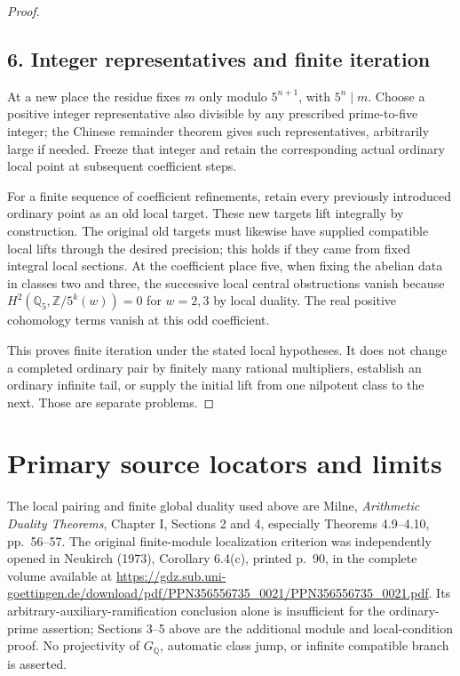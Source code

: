 \documentclass[11pt]{article}
\newcommand{\Z}{\mathbb Z}\newcommand{\F}{\mathbb F}\newcommand{\Q}{\mathbb Q}
\begin{document}
\begin{proof}
\subsection*{6. Integer representatives and finite iteration}
At a new place the residue fixes $m$ only modulo $5^{n+1}$, with $5^n\mid m$. Choose a positive integer representative also divisible by any prescribed prime-to-five integer; the Chinese remainder theorem gives such representatives, arbitrarily large if needed. Freeze that integer and retain the corresponding actual ordinary local point at subsequent coefficient steps.

For a finite sequence of coefficient refinements, retain every previously introduced ordinary point as an old local target. These new targets lift integrally by construction. The original old targets must likewise have supplied compatible local lifts through the desired precision; this holds if they came from fixed integral local sections. At the coefficient place five, when fixing the abelian data in classes two and three, the successive local central obstructions vanish because $H^2(\Q_5,\Z/5^k(w))=0$ for $w=2,3$ by local duality. The real positive cohomology terms vanish at this odd coefficient.

This proves finite iteration under the stated local hypotheses. It does not change a completed ordinary pair by finitely many rational multipliers, establish an ordinary infinite tail, or supply the initial lift from one nilpotent class to the next. Those are separate problems.
\end{proof}

\section*{Primary source locators and limits}
The local pairing and finite global duality used above are Milne, \emph{Arithmetic Duality Theorems}, Chapter I, Sections 2 and 4, especially Theorems 4.9--4.10, pp.~56--57. The original finite-module localization criterion was independently opened in Neukirch (1973), Corollary 6.4(c), printed p.~90, in the complete volume available at
\url{https://gdz.sub.uni-goettingen.de/download/pdf/PPN356556735_0021/PPN356556735_0021.pdf}.
Its arbitrary-auxiliary-ramification conclusion alone is insufficient for the ordinary-prime assertion; Sections 3--5 above are the additional module and local-condition proof. No projectivity of $G_\Q$, automatic class jump, or infinite compatible branch is asserted.
\end{document}
